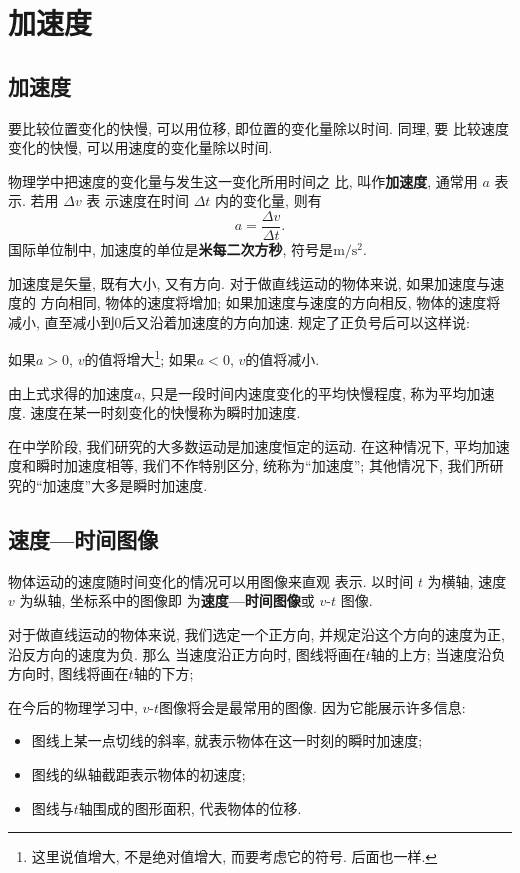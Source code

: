 \documentclass[11pt,a4paper]{ctexbook}
\begin{document}
\section{加速度}
\subsection{加速度}
要比较位置变化的快慢, 可以用位移, 即位置的变化量除以时间. 同理, 要
比较速度变化的快慢, 可以用速度的变化量除以时间.

物理学中把速度的变化量与发生这一变化所用时间之
比, 叫作\textbf{加速度}, 通常用 $a$ 表示. 若用 $\Delta v$ 表
示速度在时间 $\Delta t$ 内的变化量, 则有
\begin{equation}
    a = \frac{\Delta v}{\Delta t}.
    \label{加速度的定义}
\end{equation}
国际单位制中, 加速度的单位是\textbf{米每二次方秒}, 符号是$\mathrm{m/s^2}$.

加速度是矢量, 既有大小, 又有方向. 对于做直线运动的物体来说, 如果加速度与速度的
方向相同, 物体的速度将增加; 如果加速度与速度的方向相反, 物体的速度将减小, 直至减小到0后又沿着加速度的方向加速.
规定了正负号后可以这样说:

如果$a>0$, $v$的值将增大\footnote{这里说值增大, 不是绝对值增大, 而要考虑它的符号. 后面也一样.}; 如果$a<0$, $v$的值将减小.

由上式求得的加速度$a$, 只是一段时间内速度变化的平均快慢程度, 称为平均加速度.
速度在某一时刻变化的快慢称为瞬时加速度.

在中学阶段, 我们研究的大多数运动是加速度恒定的运动. 在这种情况下, 平均加速度和瞬时加速度相等,
我们不作特别区分, 统称为``加速度''; 其他情况下, 我们所研究的``加速度''大多是瞬时加速度.

\subsection{速度—时间图像}

物体运动的速度随时间变化的情况可以用图像来直观
表示. 以时间 $t$ 为横轴, 速度 $v$ 为纵轴, 坐标系中的图像即
为\textbf{速度—时间图像}或 $v$-$t$ 图像.

对于做直线运动的物体来说, 我们选定一个正方向, 并规定沿这个方向的速度为正, 沿反方向的速度为负. 那么
当速度沿正方向时, 图线将画在$t$轴的上方; 当速度沿负方向时, 图线将画在$t$轴的下方;

在今后的物理学习中, $v$-$t$图像将会是最常用的图像. 因为它能展示许多信息:
\begin{itemize}
    \item 图线上某一点切线的斜率, 就表示物体在这一时刻的瞬时加速度;
    \item 图线的纵轴截距表示物体的初速度;
    \item 图线与$t$轴围成的图形面积, 代表物体的位移.
\end{itemize}
\end{document}
